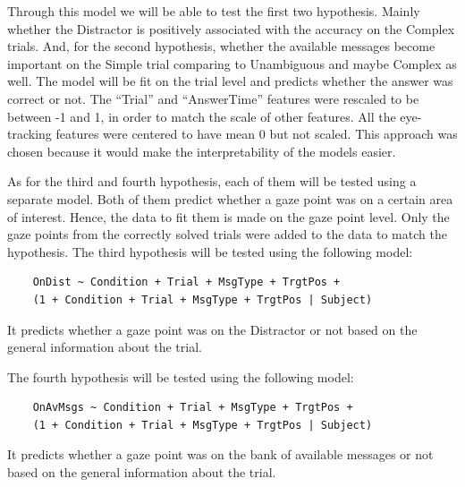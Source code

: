 Through this model we will be able to test the first two hypothesis. Mainly whether the Distractor is positively associated with the accuracy on the Complex trials. And, for the second hypothesis, whether the available messages become important on the Simple trial comparing to Unambiguous and maybe Complex as well. The model will be fit on the trial level and predicts whether the answer was correct or not. The ``Trial'' and ``AnswerTime'' features were rescaled to be between -1 and 1, in order to match the scale of other features. All the eye-tracking features were centered to have mean 0 but not scaled. This approach was chosen because it would make the interpretability of the models easier.

As for the third and fourth hypothesis, each of them will be tested using a separate model. Both of them predict whether a gaze point was on a certain area of interest. Hence, the data to fit them is made on the gaze point level. Only the gaze points from the correctly solved trials were added to the data to match the hypothesis. The third hypothesis will be tested using the following model:
\begin{verbatim}
    OnDist ~ Condition + Trial + MsgType + TrgtPos +
    (1 + Condition + Trial + MsgType + TrgtPos | Subject)
\end{verbatim}
It predicts whether a gaze point was on the Distractor or not based on the general information about the trial. 

The fourth hypothesis will be tested using the following model:
\begin{verbatim}
    OnAvMsgs ~ Condition + Trial + MsgType + TrgtPos +
    (1 + Condition + Trial + MsgType + TrgtPos | Subject)
\end{verbatim}
It predicts whether a gaze point was on the bank of available messages or not based on the general information about the trial. 

